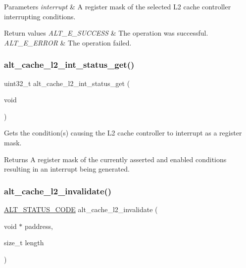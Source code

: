 \begin{DoxyParams}{Parameters}
{\em interrupt} & A register mask of the selected L2 cache controller interrupting conditions.\\
\hline
\end{DoxyParams}

\begin{DoxyRetVals}{Return values}
{\em A\+L\+T\+\_\+\+E\+\_\+\+S\+U\+C\+C\+E\+SS} & The operation was successful. \\
\hline
{\em A\+L\+T\+\_\+\+E\+\_\+\+E\+R\+R\+OR} & The operation failed. \\
\hline
\end{DoxyRetVals}
\mbox{\label{group__CACHE__L2_ga2de7e9de23c2269431442082abdcf44e}} 
\subsubsection{\texorpdfstring{alt\_cache\_l2\_int\_status\_get()}{alt\_cache\_l2\_int\_status\_get()}}
{\footnotesize\ttfamily uint32\+\_\+t alt\+\_\+cache\+\_\+l2\+\_\+int\+\_\+status\+\_\+get (\begin{DoxyParamCaption}\item[{void}]{ }\end{DoxyParamCaption})}

Gets the condition(s) causing the L2 cache controller to interrupt as a register mask.

\begin{DoxyReturn}{Returns}
A register mask of the currently asserted and enabled conditions resulting in an interrupt being generated. 
\end{DoxyReturn}
\mbox{\label{group__CACHE__L2_ga8966481a84ce459a27cb6d4083a0db50}} 
\subsubsection{\texorpdfstring{alt\_cache\_l2\_invalidate()}{alt\_cache\_l2\_invalidate()}}
{\footnotesize\ttfamily \mbox{\hyperlink{hwlib_8h_abdb0d369f069723ca55d6c94bcaaaa12}{A\+L\+T\+\_\+\+S\+T\+A\+T\+U\+S\+\_\+\+C\+O\+DE}} alt\+\_\+cache\+\_\+l2\+\_\+invalidate (\begin{DoxyParamCaption}\item[{void $\ast$}]{paddress,  }\item[{size\+\_\+t}]{length }\end{DoxyParamCaption})}

